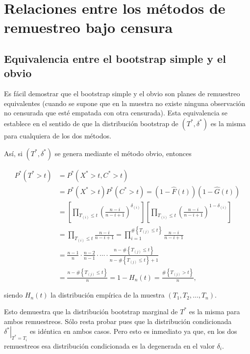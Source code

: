 \documentclass[
]{book}
\theoremstyle{break}
\theoremstyle{nonumberplain}
\begin{document}
\section{Relaciones entre los métodos de remuestreo bajo censura}\label{relaciones-entre-los-muxe9todos-de-remuestreo-bajo-censura}

\subsection{Equivalencia entre el bootstrap simple y el obvio}\label{equivalencia-entre-el-bootstrap-simple-y-el-obvio}

Es fácil demostrar que el bootstrap simple y el obvio son planes de
remuestreo equivalentes (cuando se supone que en la muestra no existe
ninguna observación no censurada que esté empatada con otra censurada).
Esta equivalencia se establece en el sentido de que la distribución
bootstrap de \(\left( T^{\ast},\delta^{\ast} \right)\) es la misma para
cualquiera de los dos métodos.

Así, si \(\left( T^{\ast},\delta^{\ast} \right)\) se genera mediante el
método obvio, entonces

\[\begin{aligned}
P^{\ast}\left( T^{\ast}>t \right) &= P^{\ast}\left( X^{\ast}>t,C^{\ast
}>t \right) \\
&= P^{\ast}\left( X^{\ast}>t \right) P^{\ast}\left( C^{\ast}>t \right)
=\left( 1-\hat{F}\left( t \right) \right) \left( 1-\hat{G}\left( t \right)
 \right) \\
&= \left[ \prod_{T_{(i)}\leq t}\left( \frac{n-i}{n-i+1} \right)
^{\delta _{(i)}}\right] \left[ \prod_{T_{(i)}\leq
t}\left( \frac{n-i}{n-i+1} \right)^{1-\delta _{(i)}}\right] \\
&= \prod_{T_{(i)}\leq t}\frac{n-i}{n-i+1}=\prod_{i=1}^{\#\left
\{ T_{(j)}\leq t\right\} }\frac{n-i}{n-i+1} \\
&= \frac{n-1}{n}\cdot \frac{n-2}{n-1}\cdot \cdots \cdot \frac{n-\#\left\{
T_{(j)}\leq t\right\} }{n-\#\left\{ T_{(j)}\leq
t\right\} +1} \\
&= \frac{n-\#\left\{ T_{(j)}\leq t\right\} }{n}=1-H_n\left(
t \right) =\frac{\#\left\{ T_{(j)}>t\right\} }{n},
\end{aligned}\]

siendo \(H_n\left( t \right)\) la distribución empírica de la muestra
\(\left( T_1,T_2,\ldots ,T_n \right)\).

Esto demuestra que la distribución bootstrap marginal de \(T^{\ast}\) es
la misma para ambos remuestreos. Sólo resta probar pues que la
distribución condicionada
\(\left. \delta^{\ast}\right\vert _{T^{\ast}=T_i}\) es idéntica en
ambos casos. Pero esto es inmediato ya que, en los dos remuestreos esa
distribución condicionada es la degenerada en el valor
\(\delta _i\).
\end{document}
